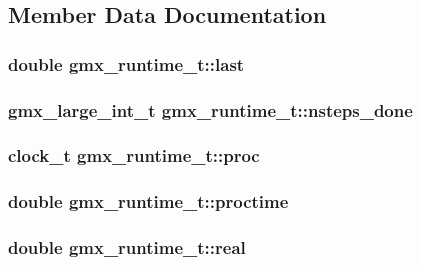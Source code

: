 \subsection{\-Member \-Data \-Documentation}
\hypertarget{structgmx__runtime__t_aa8821854ff9dd19f021311f217d770da}{
\subsubsection[{last}]{\setlength{\rightskip}{0pt plus 5cm}double {\bf gmx\-\_\-runtime\-\_\-t\-::last}}}\label{structgmx__runtime__t_aa8821854ff9dd19f021311f217d770da}
\hypertarget{structgmx__runtime__t_a3eb381d017ad8882627ee81924136574}{
\subsubsection[{nsteps\-\_\-done}]{\setlength{\rightskip}{0pt plus 5cm}gmx\-\_\-large\-\_\-int\-\_\-t {\bf gmx\-\_\-runtime\-\_\-t\-::nsteps\-\_\-done}}}\label{structgmx__runtime__t_a3eb381d017ad8882627ee81924136574}
\hypertarget{structgmx__runtime__t_aa672da784c35075c08a5a32f3383d88c}{
\subsubsection[{proc}]{\setlength{\rightskip}{0pt plus 5cm}clock\-\_\-t {\bf gmx\-\_\-runtime\-\_\-t\-::proc}}}\label{structgmx__runtime__t_aa672da784c35075c08a5a32f3383d88c}
\hypertarget{structgmx__runtime__t_a6a810c82e3520e1eb3f9b450b1560804}{
\subsubsection[{proctime}]{\setlength{\rightskip}{0pt plus 5cm}double {\bf gmx\-\_\-runtime\-\_\-t\-::proctime}}}\label{structgmx__runtime__t_a6a810c82e3520e1eb3f9b450b1560804}
\hypertarget{structgmx__runtime__t_a85e2ed5abe29010507001fc87ab8ada4}{
\subsubsection[{real}]{\setlength{\rightskip}{0pt plus 5cm}double {\bf gmx\-\_\-runtime\-\_\-t\-::real}}}\label{structgmx__runtime__t_a85e2ed5abe29010507001fc87ab8ada4}
